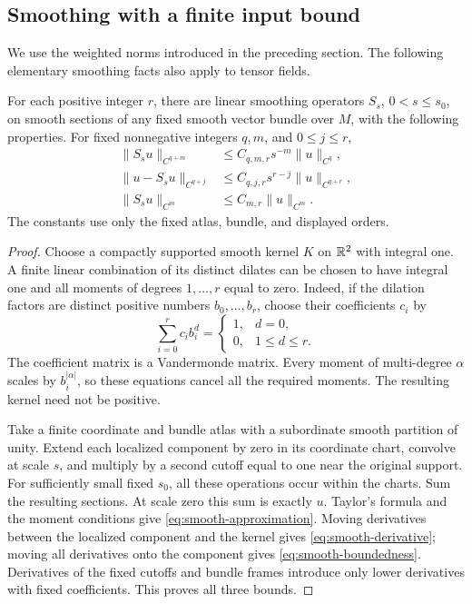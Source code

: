 \subsection{Smoothing with a finite input bound}

We use the weighted norms introduced in the preceding section.
The following elementary smoothing facts also apply to tensor fields.

\begin{lemma}\label{lem:finite-order-smoothing}
For each positive integer $r$, there are linear smoothing operators
$S_s$, $0<s\le s_0$, on smooth sections of any fixed smooth vector
bundle over $M$, with the following properties.  For fixed
nonnegative integers $q,m$, and $0\le j\le r$,
\begin{align}
 \|S_s u\|_{C^{q+m}}&\le C_{q,m,r}s^{-m}\|u\|_{C^q},
 \label{eq:smooth-derivative}\\
 \|u-S_su\|_{C^{q+j}}&\le C_{q,j,r}s^{r-j}\|u\|_{C^{q+r}},
 \label{eq:smooth-approximation}\\
 \|S_su\|_{C^m}&\le C_{m,r}\|u\|_{C^m}.
 \label{eq:smooth-boundedness}
\end{align}
The constants use only the fixed atlas, bundle, and displayed orders.
\end{lemma}

\begin{proof}
Choose a compactly supported smooth kernel $K$ on $\mathbb{R}^2$ with integral
one.  A finite linear combination of its distinct dilates can be
chosen to have integral one and all moments of degrees $1,\ldots,r$
equal to zero.  Indeed, if the dilation factors are distinct positive
numbers $b_0,\ldots,b_r$, choose their coefficients $c_i$ by
\[
 \sum_{i=0}^r c_i b_i^d=
 \begin{cases}1,&d=0,\\0,&1\le d\le r.\end{cases}
\]
The coefficient matrix is a Vandermonde matrix.  Every moment of
multi-degree $\alpha$ scales by $b_i^{|\alpha|}$, so these equations
cancel all the required moments.  The resulting kernel need not be
positive.

Take a finite coordinate and bundle atlas with a subordinate smooth
partition of unity.  Extend each localized component by zero in its
coordinate chart, convolve at scale $s$, and multiply by a second
cutoff equal to one near the original support.  For sufficiently
small fixed $s_0$, all these operations occur within the charts.
Sum the resulting sections.  At scale zero this sum is exactly $u$.
Taylor's formula and the moment conditions give
\eqref{eq:smooth-approximation}.  Moving derivatives between the
localized component and the kernel gives
\eqref{eq:smooth-derivative}; moving all derivatives onto the component
gives \eqref{eq:smooth-boundedness}.  Derivatives of the fixed cutoffs
and bundle frames introduce only lower derivatives with fixed
coefficients.  This proves all three bounds.
\end{proof}

